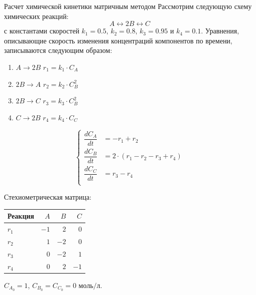\documentclass[aspectratio=169, mathserif]{beamer}	%
\begin{document}
\begin{frame}[fragile, label=c]{Расчет химической кинетики матричным методом}
\scriptsize
Рассмотрим следующую схему химических реакций:
\vfill
$$
	A \longleftrightarrow 2B \longleftrightarrow C
$$
\vfill
\noindent с константами скоростей $k_1=0.5$, $k_2=0.8$, $k_3=0.95$ и $k_4=0.1$.
Уравнения, описывающие скорость изменения концентраций компонентов по времени, записываются следующим образом:
\vfill
\begin{minipage}{.3\textwidth}
\begin{enumerate}
\item $A \longrightarrow 2B$ \quad $r_1 = k_1 \cdot C_A$
\item $2B \longrightarrow A$ \quad $r_2 = k_2 \cdot C_B ^2$
\item $2B \longrightarrow C$ \quad $r_3 = k_3 \cdot C_B ^2$
\item $C \longrightarrow 2B$ \quad $r_4 = k_4 \cdot C_C$
\end{enumerate}
\end{minipage}
\hfill
\begin{minipage}{.3\textwidth}
\begin{equation*}
	\left\{
	\begin{aligned}
		\dfrac{dC_A}{dt} &= -r_1 + r_2 \\
		\dfrac{dC_B}{dt} &=  2 \cdot \left(r_1 - r_2 - r_3 + r_4\right) \\
		\dfrac{dC_C}{dt} &=  r_3 - r_4 \\
	\end{aligned}
	\right.
\end{equation*}
\end{minipage}
\hfill
\begin{minipage}{.3\textwidth}
Стехиометрическая матрица:
\vfill
\begin{table}[h!]
\begin{tabular}{|p{.25\linewidth}|r|r|r|}
\hline
Реакция & $A$ & $B$ & $C$ \\
\hline
$r_1$ & $-1$ &  $2$ &  $0$ \\
\hline
$r_2$ &  $1$ & $-2$ &  $0$ \\
\hline
$r_3$ &  $0$ & $-2$ &  $1$ \\
\hline
$r_4$ &  $0$ &  $2$ & $-1$ \\
\hline
\end{tabular}
\end{table}
\vfill
\end{minipage}
\vfill
$C_{A_0} = 1$, $C_{B_0} = C_{C_0} = 0$ $\mathrm{моль/л}$.
\vfill
\end{frame}
\end{document}
